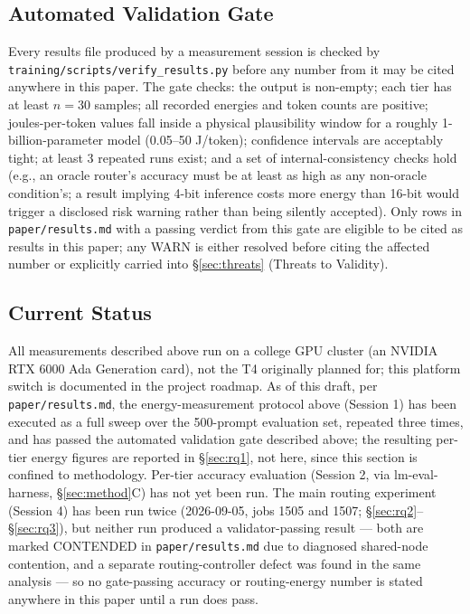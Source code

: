 \documentclass[conference]{IEEEtran}
\begin{document}
\subsection{Automated Validation Gate}
\label{sec:gate}

Every results file produced by a measurement session is checked by
\texttt{training/scripts/verify\_results.py} before any number from it
may be cited anywhere in this paper. The gate checks: the output is
non-empty; each tier has at least $n=30$ samples; all recorded energies
and token counts are positive; joules-per-token values fall inside a
physical plausibility window for a roughly 1-billion-parameter model
(0.05--50 J/token); confidence intervals are acceptably tight; at least 3
repeated runs exist; and a set of internal-consistency checks hold
(e.g., an oracle router's accuracy must be at least as high as any
non-oracle condition's; a result implying 4-bit inference costs more
energy than 16-bit would trigger a disclosed risk warning rather than
being silently accepted). Only rows in \texttt{paper/results.md} with a
passing verdict from this gate are eligible to be cited as results in
this paper; any WARN is either resolved before citing the affected
number or explicitly carried into \S\ref{sec:threats} (Threats to
Validity).

\subsection{Current Status}

All measurements described above run on a college GPU cluster (an
NVIDIA RTX 6000 Ada Generation card), not the T4 originally planned for;
this platform switch is documented in the project roadmap. As of this
draft, per \texttt{paper/results.md}, the energy-measurement protocol
above (Session 1) has been executed as a full sweep over the 500-prompt
evaluation set, repeated three times, and has passed the automated
validation gate described above; the resulting per-tier energy figures
are reported in \S\ref{sec:rq1}, not here, since this section is
confined to methodology. Per-tier accuracy evaluation (Session 2, via
lm-eval-harness, \S\ref{sec:method}C) has not yet been run. The main
routing experiment (Session 4) has been run twice (2026-09-05, jobs 1505
and 1507; \S\ref{sec:rq2}--\S\ref{sec:rq3}), but neither run produced a
validator-passing result --- both are marked CONTENDED in
\texttt{paper/results.md} due to diagnosed shared-node contention, and a
separate routing-controller defect was found in the same analysis --- so
no gate-passing accuracy or routing-energy number is stated anywhere in
this paper until a run does pass.
\end{document}
